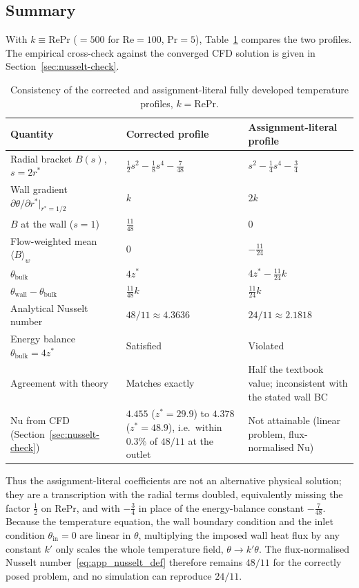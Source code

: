 \documentclass[12pt,a4paper]{article}
\newcommand{\Rey}{\text{Re}}
\newcommand{\Pran}{\text{Pr}}
\begin{document}
\subsection{Summary}

With $k\equiv\Rey\Pran$ ($=500$ for $\Rey=100$, $\Pran=5$),
Table~\ref{tab:app_temperature_formula_audit} compares the two profiles. The empirical
cross-check against the converged CFD solution is given in Section~\ref{sec:nusselt-check}.

\begin{table}[H]
\centering
\caption{Consistency of the corrected and assignment-literal fully developed temperature profiles, $k=\Rey\Pran$.}
\label{tab:app_temperature_formula_audit}
\renewcommand{\arraystretch}{1.3}
\begin{tabular}{>{\raggedright\arraybackslash}p{4.6cm}>{\raggedright\arraybackslash}p{4.8cm}>{\raggedright\arraybackslash}p{4.8cm}}
\toprule
\textbf{Quantity} & \textbf{Corrected profile} & \textbf{Assignment-literal profile} \\
\midrule
Radial bracket $B(s)$, $s=2r^*$ &
$\frac12s^2-\frac18s^4-\frac{7}{48}$ &
$s^2-\frac14s^4-\frac34$ \\
Wall gradient $\partial\theta/\partial r^*|_{r^*=1/2}$ &
$k$ &
$2k$ \\
$B$ at the wall ($s=1$) &
$\frac{11}{48}$ &
$0$ \\
Flow-weighted mean $\langle B\rangle_w$ &
$0$ &
$-\frac{11}{24}$ \\
$\theta_{\text{bulk}}$ &
$4z^*$ &
$4z^*-\frac{11}{24}k$ \\
$\theta_{\text{wall}}-\theta_{\text{bulk}}$ &
$\frac{11}{48}k$ &
$\frac{11}{24}k$ \\
Analytical Nusselt number &
$48/11\approx4.3636$ &
$24/11\approx2.1818$ \\
Energy balance $\theta_{\text{bulk}}=4z^*$ &
Satisfied &
Violated \\
Agreement with theory &
Matches \cite{ShahLondon1978,Incropera} exactly &
Half the textbook value; inconsistent with the stated wall BC \\
$\text{Nu}$ from CFD (Section~\ref{sec:nusselt-check}) &
$4.455$ ($z^*=29.9$) to $4.378$ ($z^*=48.9$), i.e.\ within $0.3\%$ of $48/11$ at the outlet &
Not attainable (linear problem, flux-normalised Nu) \\
\bottomrule
\end{tabular}
\end{table}

Thus the assignment-literal coefficients are not an alternative physical solution; they are a
transcription with the radial terms doubled, equivalently missing the factor $\tfrac12$ on
$\Rey\Pran$, and with $-\tfrac34$ in place of the energy-balance constant $-\tfrac{7}{48}$.
Because the temperature equation, the wall boundary condition and the inlet condition
$\theta_{\text{in}}=0$ are linear in $\theta$, multiplying the imposed wall heat flux by any
constant $k'$ only scales the whole temperature field, $\theta\to k'\theta$. The flux-normalised
Nusselt number~\eqref{eq:app_nusselt_def} therefore remains $48/11$ for the correctly posed
problem, and no simulation can reproduce $24/11$.
\end{document}
